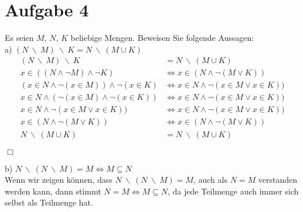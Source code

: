 \section*{Aufgabe 4}

Es seien $M$, $N$, $K$ beliebige Mengen. Beweisen Sie folgende Aussagen:\\

a) $(N \ \backslash \ M) \ \backslash \ K = N \ \backslash \ (M \cup K)$\\

\begin{align*}
(N \ \backslash \ M) \ \backslash \ K &= N \ \backslash \ (M \cup K)\\
x \in ((N \land \lnot M) \land \lnot K) &\Leftrightarrow x \in (N \land \lnot (M \lor K))\\
(x \in N \land \lnot (x \in M)) \land \lnot (x \in K) &\Leftrightarrow x \in N \land \lnot (x \in M \lor x \in K))\\
x \in N \land (\lnot (x \in M) \land \lnot (x \in K)) &\Leftrightarrow x \in N \land \lnot (x \in M \lor x \in K))\\
x \in N \land \lnot (x \in M \lor x \in K)) &\Leftrightarrow x \in N \land \lnot (x \in M \lor x \in K))\\
x \in (N \land \lnot (M \lor K)) &\Leftrightarrow x \in (N \land \lnot (M \lor K))\\
N \ \backslash \ (M \cup K) &= N \ \backslash \ (M \cup K)
\end{align*}
\begin{FlushRight}
$\Box$
\end{FlushRight}

b) $N \ \backslash \ (N \ \backslash \ M) = M \Leftrightarrow M \subseteq N$\\

Wenn wir zeigen können, dass $N \ \backslash \ (N \ \backslash \ M) = M$, auch als $N = M$ verstanden werden kann, dann stimmt $N = M \Leftrightarrow M \subseteq N$, da jede Teilmenge auch immer sich selbst als Teilmenge hat.

\newpage
